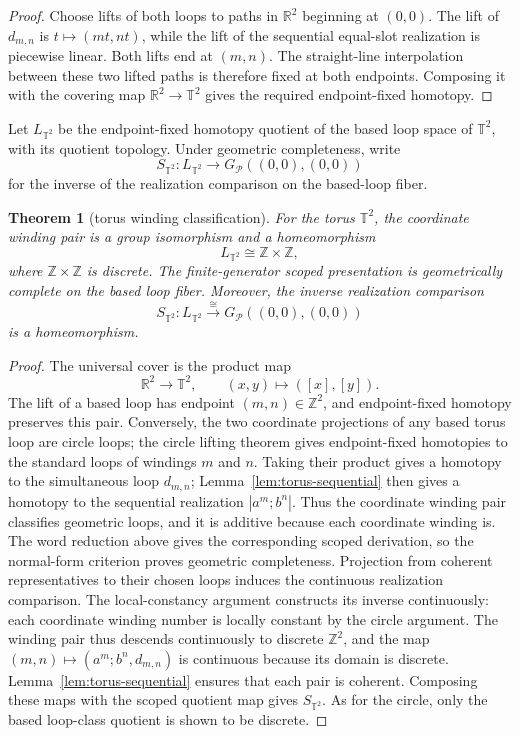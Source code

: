 \documentclass[10pt,reqno]{amsart}
\theoremstyle{definition}
\theoremstyle{plain}
\newtheorem{theorem}[definition]{Theorem}
\theoremstyle{remark}
\newcommand{\Z}{\mathbb Z}
\begin{document}
\begin{proof}
Choose lifts of both loops to paths in $\mathbb R^2$ beginning at $(0,0)$.
The lift of $d_{m,n}$ is $t\mapsto(mt,nt)$, while the lift of the sequential
equal-slot realization is piecewise linear.  Both lifts end at $(m,n)$.
The straight-line interpolation between these two lifted paths is therefore
fixed at both endpoints.  Composing it with the covering map
$\mathbb R^2\to\mathbb T^2$ gives the required endpoint-fixed homotopy.
\end{proof}

Let $L_{\mathbb T^2}$ be the endpoint-fixed homotopy quotient of the based
loop space of $\mathbb T^2$, with its quotient topology.  Under geometric
completeness, write
\[
  S_{\mathbb T^2}:L_{\mathbb T^2}\longrightarrow
  G_{\mathcal P}((0,0),(0,0))
\]
for the inverse of the realization comparison on the based-loop fiber.

\begin{theorem}[torus winding classification]
\label{thm:torus-winding}
For the torus $\mathbb T^2$, the coordinate winding pair is a group
isomorphism and a homeomorphism
\[
  L_{\mathbb T^2}\cong\Z\times\Z,
\]
where $\Z\times\Z$ is discrete.
The finite-generator scoped presentation is geometrically complete on the
based loop fiber.  Moreover, the inverse realization comparison
\[
  S_{\mathbb T^2}:L_{\mathbb T^2}\xrightarrow{\ \cong\ }
  G_{\mathcal P}((0,0),(0,0))
\]
is a homeomorphism.
\end{theorem}

\begin{proof}
The universal cover is the product map
\[
  \mathbb R^2\longrightarrow\mathbb T^2,
  \qquad (x,y)\longmapsto([x],[y]).
\]
The lift of a based loop has endpoint $(m,n)\in\mathbb Z^2$, and endpoint-fixed
homotopy preserves this pair.  Conversely, the two coordinate projections of
any based torus loop are circle loops; the circle lifting theorem gives
endpoint-fixed homotopies to the standard loops of windings $m$ and $n$.
Taking their product gives a homotopy to the simultaneous loop $d_{m,n}$;
Lemma~\ref{lem:torus-sequential} then gives a homotopy to the sequential
realization $|a^m;b^n|$.  Thus the coordinate winding pair classifies
geometric loops, and it is additive because each coordinate winding is.  The word reduction above gives the corresponding scoped
derivation, so the normal-form criterion proves geometric completeness.
Projection from coherent representatives to their chosen loops induces
the continuous realization comparison.  The local-constancy argument
constructs its inverse continuously: each coordinate
winding number is locally constant by the circle argument.  The winding pair thus
descends continuously to discrete $\Z^2$, and the map
$(m,n)\mapsto(a^m;b^n,d_{m,n})$ is continuous because its domain is discrete.
Lemma~\ref{lem:torus-sequential} ensures that each pair is coherent.
Composing these maps with the scoped quotient map gives $S_{\mathbb T^2}$.
As for the circle, only the based loop-class quotient is shown to be
discrete.
\end{proof}
\end{document}
